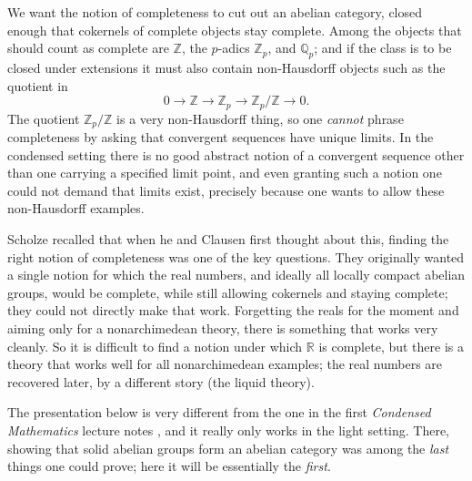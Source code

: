 We want the notion of completeness to cut out an abelian category, closed enough
that cokernels of complete objects stay complete. Among the objects that should
count as complete are $\mathbb{Z}$, the $p$-adics $\mathbb{Z}_p$, and $\mathbb{Q}_p$;
and if the class is to be closed under extensions it must also contain non-Hausdorff
objects such as the quotient in
\begin{equation*}
0\longrightarrow\mathbb{Z}\longrightarrow\mathbb{Z}_p\longrightarrow
\mathbb{Z}_p/\mathbb{Z}\longrightarrow0 .
\end{equation*}
The quotient $\mathbb{Z}_p/\mathbb{Z}$ is a very non-Hausdorff thing, so one
\emph{cannot} phrase completeness by asking that convergent sequences have unique
limits. In the condensed setting there is no good abstract notion of a convergent
sequence other than one carrying a specified limit point, and even granting such
a notion one could not demand that limits exist, precisely because one wants to
allow these non-Hausdorff examples.

\begin{remark}
\label{rmk:5:nonarchimedean-first}
Scholze recalled that when he and Clausen first thought about this, finding the
right notion of completeness was one of the key questions. They originally wanted
a single notion for which the real numbers, and ideally all locally compact
abelian groups, would be complete, while still allowing cokernels and staying
complete; they could not directly make that work. Forgetting the reals for the
moment and aiming only for a nonarchimedean theory, there is something that works
very cleanly. So it is difficult to find a notion under which $\mathbb{R}$ is
complete, but there is a theory that works well for all nonarchimedean examples;
the real numbers are recovered later, by a different story (the liquid theory).
\end{remark}

\begin{remark}
\label{rmk:5:light-presentation}
The presentation below is very different from the one in the first
\emph{Condensed Mathematics} lecture notes \cite{scholze2019condensed}, and it
really only works in the light setting. There, showing that solid abelian groups
form an abelian category was among the \emph{last} things one could prove; here it
will be essentially the \emph{first}.
\end{remark}

